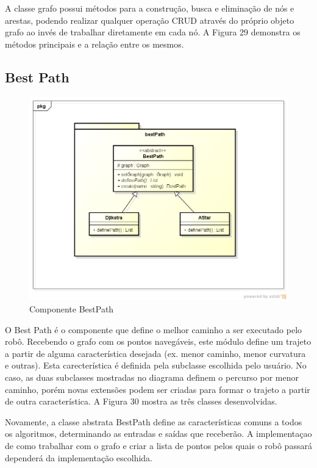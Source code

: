 A classe grafo possui métodos para a construção, busca e eliminação de nós e arestas, podendo realizar qualquer operação CRUD através do próprio objeto grafo ao invés de trabalhar diretamente em cada nó. A Figura 29 demonstra os métodos principais e a relação entre os mesmos.

\subsection{Best Path}

\begin{figure}[h]
	\centering
	\label{fig30}
		\includegraphics[keepaspectratio=true,scale=0.5]{figuras/pkgbestPath.png}
	\caption{Componente BestPath}
\end{figure}

O Best Path é o componente que define o melhor caminho a ser executado pelo robô. Recebendo o grafo com os pontos navegáveis, este módulo define um trajeto a partir de alguma característica desejada (ex. menor caminho, menor curvatura e outras). Esta carecterística é definida pela subclasse escolhida pelo usuário. No caso, as duas subclasses mostradas no diagrama definem o percurso por menor caminho, porém novas extensões podem ser criadas para formar o trajeto a partir de outra característica. A Figura 30 mostra as três classes desenvolvidas.

Novamente, a classe abstrata BestPath define as características comuns a todos os algoritmos, determinando as entradas e saídas que receberão. A implementaçao de como trabalhar com o grafo e criar a lista de pontos pelos quais o robô passará dependerá da implementação escolhida.

